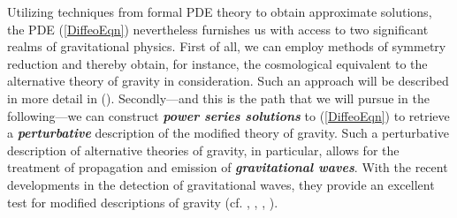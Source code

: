 \documentclass[%
preprint,
titlepage,
nofootinbib,
amsmath,amssymb,
showkeys,
aps,
prd,
floatfix,
]{revtex4-2}
\begin{document}
Utilizing techniques from formal PDE theory to obtain approximate solutions, the PDE (\ref{DiffeoEqn}) nevertheless furnishes us with access to two significant realms of gravitational physics. First of all, we can employ methods of symmetry reduction and thereby obtain, for instance, the cosmological equivalent to the alternative theory of gravity in consideration. Such an approach will be described in more detail in (\cite{NilsPHD}).
Secondly---and this is the path that we will pursue in the following---we can construct \textit{\textbf{power series solutions}} to (\ref{DiffeoEqn}) to retrieve a \textbf{\textit{perturbative}} description of the modified theory of gravity. Such a perturbative description of alternative theories of gravity, in particular, allows for the treatment of propagation and emission of \textit{\textbf{gravitational waves}}.
With the recent developments in the detection of gravitational waves, they provide an excellent test for modified descriptions of gravity (cf. \cite{2010PhRvD..81f4008Y}, \cite{2011PhRvD..83j4022B}, \cite{2017PhRvD..95j4027Z}, \cite{2013LRR....16....9Y} ).
\end{document}
